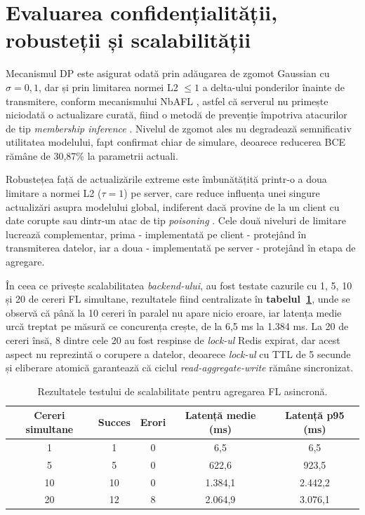 \documentclass[12pt,a4paper]{report}
\begin{document}
\section{Evaluarea confidențialității, robusteții și scalabilității}

Mecanismul DP este asigurat odată prin adăugarea de zgomot Gaussian cu $\sigma = 0{,}1$, dar și prin limitarea normei L2 $\leq1$ a delta-ului ponderilor înainte de transmitere, conform mecanismului NbAFL \cite{wei2020nbafl}, astfel că serverul nu primește niciodată o actualizare curată, fiind o metodă de prevenție împotriva atacurilor de tip \textit{membership inference} \cite{shokri2017membership}. Nivelul de zgomot ales nu degradează semnificativ utilitatea modelului, fapt confirmat chiar de simulare, deoarece reducerea BCE rămâne de 30,87\% la parametrii actuali.

Robustețea față de actualizările extreme este îmbunătățită printr-o a doua limitare a normei L2 ($\tau = 1$) pe server, care reduce influența unei singure actualizări asupra modelului global, indiferent dacă provine de la un client cu date corupte sau dintr-un atac de tip \textit{poisoning} \cite{lyu2020threats}. Cele două niveluri de limitare lucrează complementar, prima - implementată pe client - protejând în transmiterea datelor, iar a doua - implementată pe server - protejând în etapa de agregare.

În ceea ce privește scalabilitatea \textit{backend-ului}, au fost testate cazurile cu 1, 5, 10 și 20 de cereri FL simultane, rezultatele fiind centralizate în \textbf{tabelul~\ref{tab:load-test}}, unde se observă că până la 10 cereri în paralel nu apare nicio eroare, iar latența medie urcă treptat pe măsură ce concurența crește, de la 6,5 ms la 1.384 ms. La 20 de cereri însă, 8 dintre cele 20 au fost respinse de \textit{lock-ul} Redis expirat, dar acest aspect nu reprezintă o corupere a datelor, deoarece \textit{lock-ul} cu TTL de 5 secunde și eliberare atomică garantează că ciclul \textit{read-aggregate-write} rămâne sincronizat.

\begin{table}[h]
\centering
\footnotesize
\caption{Rezultatele testului de scalabilitate pentru agregarea FL asincronă.}
\label{tab:load-test}
\begin{tabular}{|c|c|c|c|c|}
\hline
\textbf{Cereri simultane} & \textbf{Succes} & \textbf{Erori} & \textbf{Latență medie (ms)} & \textbf{Latență p95 (ms)} \\
\hline
1  & 1  & 0 & 6,5    & 6,5    \\
\hline
5  & 5  & 0 & 622,6  & 923,5  \\
\hline
10 & 10 & 0 & 1.384,1 & 2.442,2 \\
\hline
20 & 12 & 8 & 2.064,9 & 3.076,1 \\
\hline
\end{tabular}
\end{table}
\end{document}
